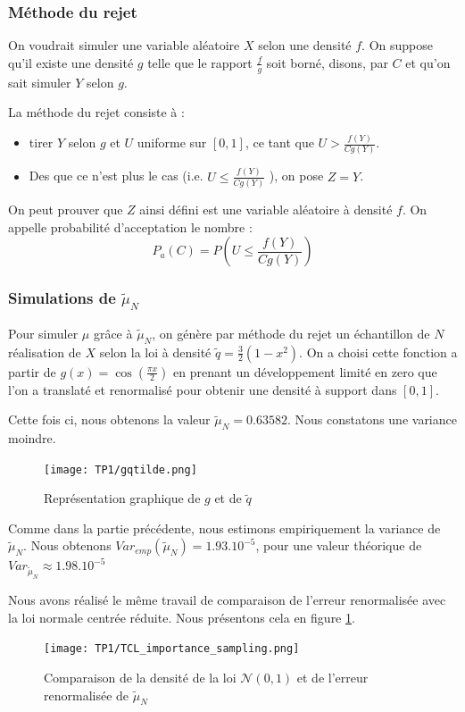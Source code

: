 \documentclass{article}
\begin{document}
\subsubsection{Méthode du rejet}
 On voudrait simuler une variable aléatoire $X$
 selon une densité $f$.
 On suppose qu'il existe une densité $g$ telle que le rapport $\frac{f}{g}$ soit borné, disons, par $C$ et qu'on 
 sait simuler $Y$ selon $g$.

 La méthode du rejet consiste à :
 \begin{itemize}
   \item tirer $Y$ selon $g$ et $U$ uniforme sur $[0,1]$,
ce tant que $U>\frac{f(Y)}{Cg(Y)}$. 
   \item Des que ce n'est plus le cas (i.e. $U\leq \frac{f(Y)}{Cg(Y)}$ ), on pose $Z=Y$.
\end{itemize}
On peut prouver que $Z$ ainsi défini est une variable aléatoire à densité $f$.
On appelle probabilité d'acceptation le nombre :
\[P_{a}(C)=P(U\leq \frac{f(Y)}{Cg(Y)})\]
\subsubsection{Simulations de $\tilde{\mu}_{N}$}

Pour simuler $\mu$ grâce à $\tilde{\mu}_{N}$, on génère par méthode du rejet un échantillon de $N$
réalisation de $X$ selon la loi à densité $\tilde{q} = \frac{3}{2}(1 - x^2)  $. On a choisi cette
fonction a partir de $g(x)= \cos (\frac{\pi x}{2})$  en prenant un développement
limité en zero que l'on a translaté et renormalisé pour obtenir une densité à 
support dans $[0,1]$.

Cette fois ci, nous obtenons la valeur $\tilde{\mu}_{N}=0.63582$. Nous constatons une variance moindre. 

\begin{figure}
   \centering
   \caption{Représentation graphique de $g$ et de $\tilde{q}$}
   \texttt{[image: TP1/gqtilde.png]}
\end{figure}

Comme dans la partie précédente, nous estimons empiriquement la variance de $\tilde{\mu}_{N}$. Nous obtenons
$Var_{emp}(\tilde{\mu}_{N})=1.93.10^{-5}$, pour une valeur théorique de $Var_{\tilde{\mu}_{N}}\approx 1.98.10^{-5}$

Nous avons réalisé le même travail de comparaison de l'erreur renormalisée avec
la loi normale centrée réduite. Nous présentons cela en figure \ref{TCL_imp}. 

\begin{figure}[h!]
   \centering
   \caption{Comparaison de la densité de la loi $\mathcal{N}(0,1)$ et de l'erreur renormalisée de $\tilde{\mu}_{N}$ }
   \texttt{[image: TP1/TCL\_importance\_sampling.png]}
   \label{TCL_imp}
\end{figure}
\end{document}
